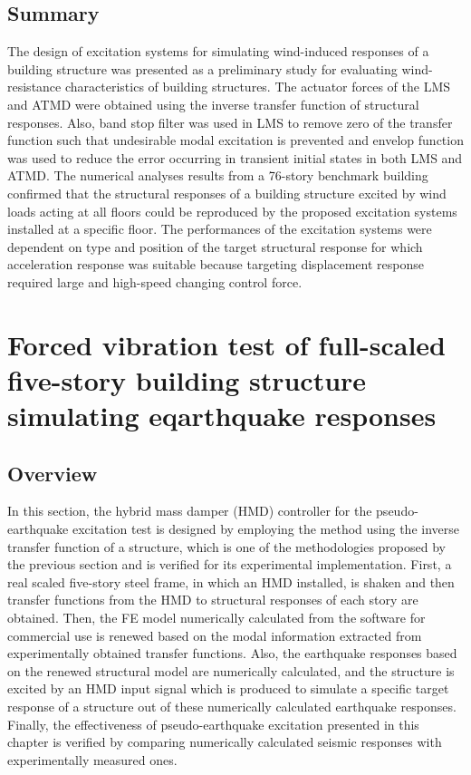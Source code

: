 \subsection{Summary}
The design of excitation systems for simulating wind-induced responses of a building structure was presented as a preliminary study for evaluating wind-resistance characteristics of building structures. The actuator forces of the LMS and ATMD were obtained using the inverse transfer function of structural responses. Also, band stop filter was used in LMS to remove zero of the transfer function such that undesirable modal excitation is prevented and envelop function was used to reduce the error occurring in transient initial states in both LMS and ATMD. The numerical analyses results from a 76-story benchmark building confirmed that the structural responses of a building structure excited by wind loads acting at all floors could be reproduced by the proposed excitation systems installed at a specific floor. The performances of the excitation systems were dependent on type and position of the target structural response for which acceleration response was suitable because targeting displacement response required large and high-speed changing control force.






\section{Forced vibration test of full-scaled five-story building structure simulating eqarthquake responses}
\label{chap:7}
\subsection{Overview}


In this section, the hybrid mass damper (HMD) controller for the pseudo-earthquake excitation test is designed by employing the method using the inverse transfer function of a structure, which is one of the methodologies proposed by the previous section and is verified for its experimental implementation. First, a real scaled five-story steel frame, in which an HMD installed, is shaken and then transfer functions from the HMD to structural responses of each story are obtained. Then, the FE model numerically calculated from the software for commercial use is renewed based on the modal information extracted from experimentally obtained transfer functions. Also, the earthquake responses based on the renewed structural model are numerically calculated, and the structure is excited by an HMD input signal which is produced to simulate a specific target response of a structure out of these numerically calculated earthquake responses. Finally, the effectiveness of pseudo-earthquake excitation presented in this chapter is verified by comparing numerically calculated seismic responses with experimentally measured ones.

